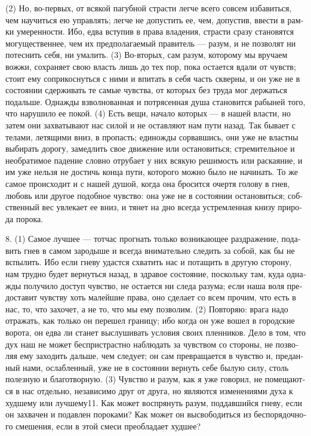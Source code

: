 (2) Но, во-пер­вых, от вся­кой пагуб­ной стра­сти лег­че все­го совсем изба­вить­ся, чем научить­ся ею управ­лять; лег­че не допу­стить ее, чем, допу­стив, вве­сти в рам­ки уме­рен­но­сти. Ибо, едва всту­пив в пра­ва вла­де­ния, стра­сти сра­зу ста­но­вят­ся могу­ще­ст­вен­нее, чем их пред­по­ла­гае­мый пра­ви­тель --- разум, и не поз­во­лят ни потес­нить себя, ни ума­лить. (3) Во-вто­рых, сам разум, кото­ро­му мы вру­ча­ем вож­жи, сохра­ня­ет свою власть лишь до тех пор, пока оста­ет­ся вда­ли от чувств; сто­ит ему сопри­кос­нуть­ся с ними и впи­тать в себя часть сквер­ны, и он уже не в состо­я­нии сдер­жи­вать те самые чув­ства, от кото­рых без труда мог дер­жать­ся подаль­ше. Одна­жды взвол­но­ван­ная и потря­сен­ная душа ста­но­вит­ся рабы­ней того, что нару­ши­ло ее покой. (4) Есть вещи, нача­ло кото­рых --- в нашей вла­сти, но затем они захва­ты­ва­ют нас силой и не остав­ля­ют нам пути назад. Так быва­ет с тела­ми, летя­щи­ми вниз, в про­пасть; еди­но­жды сорвав­шись, они уже не власт­ны выби­рать доро­гу, замед­лить свое дви­же­ние или оста­но­вить­ся; стре­ми­тель­ное и необ­ра­ти­мое паде­ние слов­но отру­ба­ет у них вся­кую реши­мость или рас­ка­я­ние, и им уже нель­зя не достичь кон­ца пути, кото­ро­го мож­но было не начи­нать. То же самое про­ис­хо­дит и с нашей душой, когда она бро­сит­ся очер­тя голо­ву в гнев, любовь или дру­гое подоб­ное чув­ство: она уже не в состо­я­нии оста­но­вить­ся; соб­ст­вен­ный вес увле­ка­ет ее вниз, и тянет на дно все­гда устрем­лен­ная кни­зу при­ро­да поро­ка.

8. (1) Самое луч­шее --- тот­час про­гнать толь­ко воз­ни­каю­щее раз­дра­же­ние, пода­вить гнев в самом заро­ды­ше и все­гда вни­ма­тель­но следить за собой, как бы не вспы­лить. Ибо если гне­ву удаст­ся схва­тить нас и пота­щить в дру­гую сто­ро­ну, нам труд­но будет вер­нуть­ся назад, в здра­вое состо­я­ние, посколь­ку там, куда одна­жды полу­чи­ло доступ чув­ство, не оста­ет­ся ни следа разу­ма; если наша воля пре­до­ста­вит чув­ству хоть малей­шие пра­ва, оно сде­ла­ет со всем про­чим, что есть в нас, то, что захо­чет, а не то, что мы ему поз­во­лим. (2) Повто­ряю: вра­га надо отра­жать, как толь­ко он пере­шел гра­ни­цу; ибо когда он уже вошел в город­ские ворота, он едва ли станет выслу­ши­вать усло­вия сво­их плен­ни­ков. Дело в том, что дух наш не может бес­при­страст­но наблюдать за чув­ст­вом со сто­ро­ны, не поз­во­ляя ему захо­дить даль­ше, чем сле­ду­ет; он сам пре­вра­ща­ет­ся в чув­ство и, пре­дан­ный нами, ослаб­лен­ный, уже не в состо­я­нии вер­нуть себе былую силу, столь полез­ную и бла­готвор­ную. (3) Чув­ство и разум, как я уже гово­рил, не поме­ща­ют­ся в нас отдель­но, неза­ви­си­мо друг от дру­га, но явля­ют­ся изме­не­ни­я­ми духа к худ­ше­му или лучшему11. Как может вос­пря­нуть разум, под­дав­ший­ся гне­ву, если он захва­чен и подав­лен поро­ка­ми? Как может он высво­бо­дить­ся из бес­по­рядоч­но­го сме­ше­ния, если в этой сме­си пре­об­ла­да­ет худ­шее?

